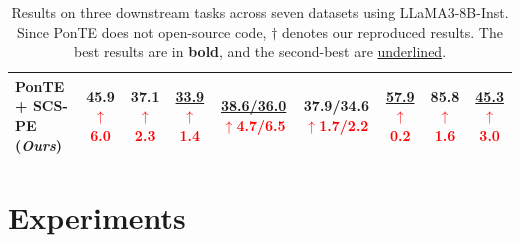 \documentclass[11pt]{article}
\newcommand{\up}[1]{\textcolor{red}{{$\uparrow$#1}}}
\begin{document}
\begin{table}[t]
{\begin{tabular}{l ccc cc cc c}
  \textbf{PonTE + SCS-PE (\textbf{\textit{Ours}})} 
& \cellcolor{tabcolor3} \textbf{45.9} \up{6.0} 
& \cellcolor{tabcolor3} \textbf{37.1} \up{2.3}
& \cellcolor{tabcolor3} \underline{33.9} \up{1.4}
& \cellcolor{tabcolor3} \underline{38.6/36.0} \up{4.7/6.5}
& \cellcolor{tabcolor3} \textbf{37.9/34.6} \up{1.7/2.2}
& \cellcolor{tabcolor3} \underline{57.9} \up{0.2}
& \cellcolor{tabcolor3} \textbf{85.8} \up{1.6}
& \cellcolor{tabcolor3} \underline{45.3} \up{3.0}\\
  \bottomrule
\end{tabular}
}
\caption{Results on three downstream tasks across seven datasets using LLaMA3-8B-Inst. Since PonTE does not open-source code, $\dag$ denotes our reproduced results. The best results are in \textbf{bold}, and the second-best are \underline{underlined}.}
\label{tab:results}
\end{table}

\section{Experiments}
\end{document}
